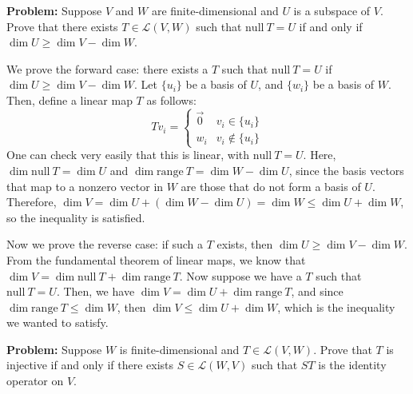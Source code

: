 \documentclass[10pt]{article}
\newcommand{\range}{\mathrm{range \ }}
\renewcommand{\null}{\mathrm{null \ }}
\newenvironment{problem}{\textbf{Problem:}}{}
\begin{document}
	\begin{problem}
		Suppose \( V \) and \( W \) are finite-dimensional and \( U \) is a subspace of \( V \). Prove that 
		there exists \( T \in \mathcal L(V, W) \) such that \( \null T = U \) if and only if 
		\( \dim U \ge  \dim V - \dim W \). 
	\end{problem}
	

	\begin{solution}
		We prove the forward case: there exists a \( T \) such that \( \null T = U \) if 
		\( \dim U \ge \dim V - \dim W \). Let \( \{u_i \} \) be a basis of \( U \), and \( \{ w_i \} \) be a basis 
		of \( W \). Then, define a linear map \( T \) as follows:
		\[
		Tv_i = \begin{cases}
			\vec 0 & v_i \in \{u_i\} \\
			w_i & v_i \not \in \{u_i\} 
		\end{cases}
		\] 
		One can check very easily that this is linear, with \( \null T = U \). Here, \( \dim \null T = \dim U\)
		and \( \dim \range T = \dim W - \dim U \), since the basis vectors that map to a nonzero vector in \( W \) 
		are those that do not form a basis of \( U \). Therefore, \( \dim V = \dim U + (\dim W - \dim U) = \dim W
		\le \dim U + \dim W\), so the inequality is satisfied. 


		Now we prove the reverse case: if such a \( T \) exists, then \( \dim U \ge \dim V - \dim W \). 
		From the fundamental theorem of linear maps, we know that 
		\( \dim V = \dim \null T + \dim \range T \). Now suppose we have a \( T \) such that \( \null T = U \). 
		Then, we have \( \dim V = \dim U + \dim \range T \), and since \( \dim \range T \le \dim W \), then 
		\( \dim V \le  \dim U + \dim W  \), which is the inequality we wanted to satisfy. 
	\end{solution}

	\begin{problem}
		Suppose \( W \) is finite-dimensional and \( T \in \mathcal L(V, W) \). Prove that \( T \) is 
		injective if and only if there exists \( S \in \mathcal L(W, V)  \) such that \( ST \) is the identity 
		operator on \( V \).
	\end{problem}
\end{document}
